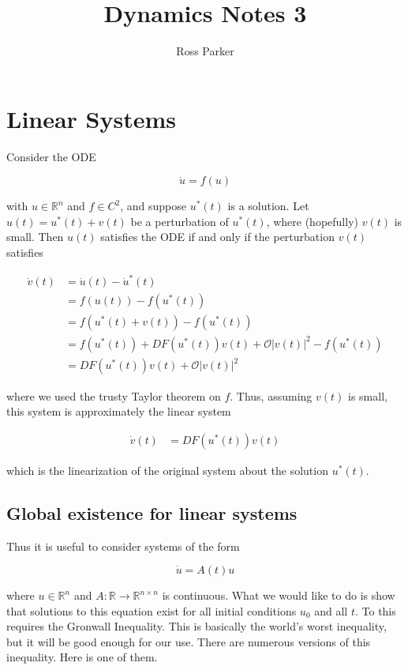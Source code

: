 \documentclass{article}
\title{Dynamics Notes 3}
\author{Ross Parker}
\def\R{{\mathbb R}}
\begin{document}
\section{Linear Systems}

Consider the ODE

\[
\dot{u} = f(u)
\]

with $u \in \R^n$ and $f \in C^2$, and suppose $u^*(t)$ is a solution. Let $u(t) = u^*(t) + v(t)$ be a perturbation of $u^*(t)$, where (hopefully) $v(t)$ is small. Then $u(t)$ satisfies the ODE if and only if the perturbation $v(t)$ satisfies

\begin{align*}
\dot{v}(t) &= \dot{u}(t) - \dot{u}^*(t) \\
&= f(u(t)) - f(u^*(t)) \\
&= f(u^*(t) + v(t)) - f(u^*(t)) \\
&= f(u^*(t)) + DF(u^*(t))v(t) + \mathcal{O}|v(t)|^2 - f(u^*(t)) \\
&= DF(u^*(t))v(t) + \mathcal{O}|v(t)|^2 
\end{align*}

where we used the trusty Taylor theorem on $f$. Thus, assuming $v(t)$ is small, this system is approximately the linear system

\begin{align*}
\dot{v}(t) &= DF(u^*(t))v(t) 
\end{align*}

which is the linearization of the original system about the solution $u^*(t)$. 

\subsection{Global existence for linear systems}

Thus it is useful to consider systems of the form

\[
\dot{u} = A(t) u
\]

where $u \in \R^n$ and $A:\R \rightarrow \R^{n \times n}$ is continuous. What we would like to do is show that solutions to this equation exist for all initial conditions $u_0$ and all $t$. To this requires the Gronwall Inequality. This is basically the world's worst inequality, but it will be good enough for our use. There are numerous versions of this inequality. Here is one of them.\\
\end{document}
